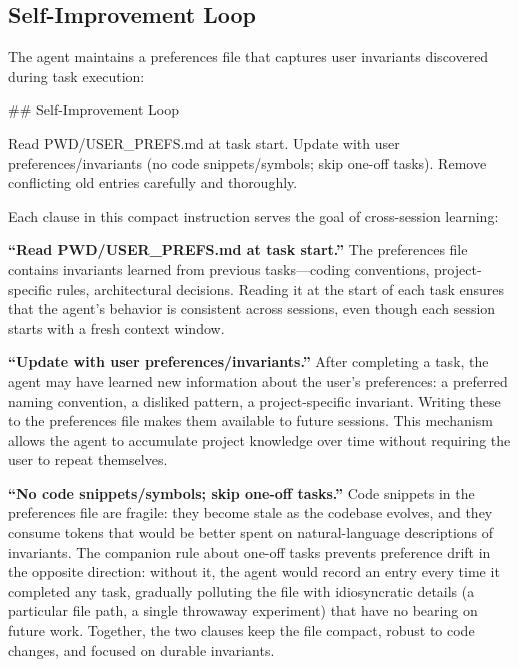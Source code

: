 \documentclass{article}
\begin{document}
\subsection{Self-Improvement Loop}

The agent maintains a preferences file that captures user invariants discovered during task execution:

\begin{prompt}
## Self-Improvement Loop

Read PWD/USER_PREFS.md at task start. Update with user preferences/invariants (no code snippets/symbols; skip one-off tasks). Remove conflicting old entries carefully and thoroughly.
\end{prompt}

\noindent Each clause in this compact instruction serves the goal of cross-session learning:

\textbf{``Read PWD/USER\_PREFS.md at task start.''}  The preferences file contains invariants learned from previous tasks---coding conventions, project-specific rules, architectural decisions.  Reading it at the start of each task ensures that the agent's behavior is consistent across sessions, even though each session starts with a fresh context window.

\textbf{``Update with user preferences/invariants.''}  After completing a task, the agent may have learned new information about the user's preferences: a preferred naming convention, a disliked pattern, a project-specific invariant.  Writing these to the preferences file makes them available to future sessions.  This mechanism allows the agent to accumulate project knowledge over time without requiring the user to repeat themselves.

\textbf{``No code snippets/symbols; skip one-off tasks.''}  Code snippets in the preferences file are fragile: they become stale as the codebase evolves, and they consume tokens that would be better spent on natural-language descriptions of invariants.  The companion rule about one-off tasks prevents preference drift in the opposite direction: without it, the agent would record an entry every time it completed any task, gradually polluting the file with idiosyncratic details (a particular file path, a single throwaway experiment) that have no bearing on future work.  Together, the two clauses keep the file compact, robust to code changes, and focused on durable invariants.
\end{document}
